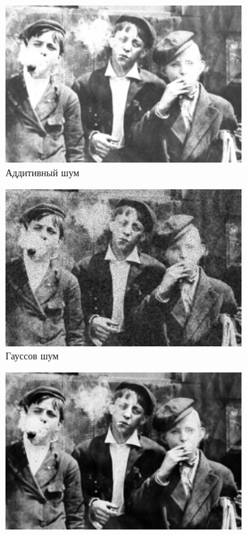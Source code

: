 \begin{figure}[ht]
\begin{subfigure}[b]{0.5\linewidth}
      \includegraphics[width=0.95\linewidth]{../Wiener_Filter/Wiener_Additive_noise_(k=7).jpg} 
      \caption{Аддитивный шум} 
      \label{weiner_7:c} 
      \vspace{4ex}
    \end{subfigure}%
    \begin{subfigure}[b]{0.5\linewidth}
      \centering
      \includegraphics[width=0.95\linewidth]{../Wiener_Filter/Wiener_Gaussian_noise_(k=7).jpg} 
      \caption{Гауссов шум} 
      \label{weiner_7:d} 
      \vspace{4ex}
    \end{subfigure}
    \begin{subfigure}[b]{0.5\linewidth}
      \centering
      \includegraphics[width=0.95\linewidth]{../Wiener_Filter/Wiener_Poisson_noise_(k=7).jpg} 

\end{subfigure}
\end{figure}
